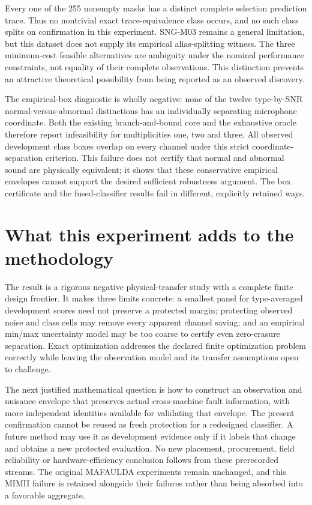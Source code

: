 \documentclass[
  11pt,
  a4paper,
]{report}
\begin{document}
Every one of the 255 nonempty masks has a distinct complete selection
prediction trace. Thus no nontrivial exact trace-equivalence class
occurs, and no such class splits on confirmation in this experiment.
SNG-M03 remains a general limitation, but this dataset does not supply
its empirical alias-splitting witness. The three minimum-cost feasible
alternatives are ambiguity under the nominal performance constraints,
not equality of their complete observations. This distinction prevents
an attractive theoretical possibility from being reported as an observed
discovery.

The empirical-box diagnostic is wholly negative: none of the twelve
type-by-SNR normal-versus-abnormal distinctions has an individually
separating microphone coordinate. Both the existing branch-and-bound
core and the exhaustive oracle therefore report infeasibility for
multiplicities one, two and three. All observed development class boxes
overlap on every channel under this strict coordinate-separation
criterion. This failure does not certify that normal and abnormal sound
are physically equivalent; it shows that these conservative empirical
envelopes cannot support the desired sufficient robustness argument. The
box certificate and the fused-classifier results fail in different,
explicitly retained ways.

\hypertarget{what-this-experiment-adds-to-the-methodology}{%
\section{What this experiment adds to the
methodology}\label{what-this-experiment-adds-to-the-methodology}}

The result is a rigorous negative physical-transfer study with a
complete finite design frontier. It makes three limits concrete: a
smallest panel for type-averaged development scores need not preserve a
protected margin; protecting observed noise and class cells may remove
every apparent channel saving; and an empirical min/max uncertainty
model may be too coarse to certify even zero-erasure separation. Exact
optimization addresses the declared finite optimization problem
correctly while leaving the observation model and its transfer
assumptions open to challenge.

The next justified mathematical question is how to construct an
observation and nuisance envelope that preserves actual cross-machine
fault information, with more independent identities available for
validating that envelope. The present confirmation cannot be reused as
fresh protection for a redesigned classifier. A future method may use it
as development evidence only if it labels that change and obtains a new
protected evaluation. No new placement, procurement, field reliability
or hardware-efficiency conclusion follows from these prerecorded
streams. The original MAFAULDA experiments remain unchanged, and this
MIMII failure is retained alongside their failures rather than being
absorbed into a favorable aggregate.
\end{document}
